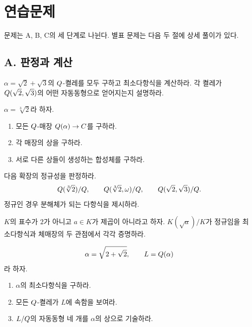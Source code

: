 \section{연습문제}
\label{sec:normal-exercises}

문제는 A, B, C의 세 단계로 나뉜다. 별표 문제는 다음 두 절에 상세 풀이가 있다.

\subsection*{A. 판정과 계산}

\begin{exercise}[*]
$\alpha=\sqrt2+\sqrt3$의 $Q$-켤레를 모두 구하고 최소다항식을 계산하라. 각 켤레가 $Q(\sqrt2,\sqrt3)$의 어떤 자동동형으로 얻어지는지 설명하라.
\end{exercise}

\begin{exercise}[*]
$\alpha=\sqrt[3]{2}$라 하자.
\begin{enumerate}[label=(\alph*)]
  \item 모든 $Q$-매장 $Q(\alpha)\to C$를 구하라.
  \item 각 매장의 상을 구하라.
  \item 서로 다른 상들이 생성하는 합성체를 구하라.
\end{enumerate}
\end{exercise}

\begin{exercise}[*]
다음 확장의 정규성을 판정하라.
\[
  Q(\sqrt[3]{2})/Q,
  \qquad
  Q(\sqrt[3]{2},\omega)/Q,
  \qquad
  Q(\sqrt2,\sqrt3)/Q.
\]
정규인 경우 분해체가 되는 다항식을 제시하라.
\end{exercise}

\begin{exercise}
$K$의 표수가 $2$가 아니고 $a\in K$가 제곱이 아니라고 하자. $K(\sqrt a)/K$가 정규임을 최소다항식과 체매장의 두 관점에서 각각 증명하라.
\end{exercise}

\begin{exercise}[*]
\[
  \alpha=\sqrt{2+\sqrt2},
  \qquad
  L=Q(\alpha)
\]
라 하자.
\begin{enumerate}[label=(\alph*)]
  \item $\alpha$의 최소다항식을 구하라.
  \item 모든 $Q$-켤레가 $L$에 속함을 보여라.
  \item $L/Q$의 자동동형 네 개를 $\alpha$의 상으로 기술하라.
\end{enumerate}
\end{exercise}

